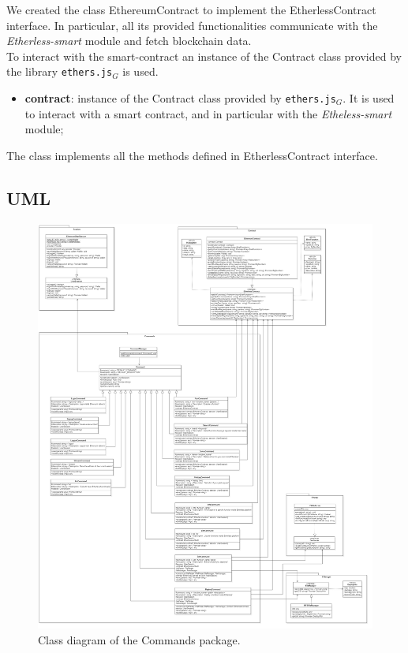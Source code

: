 			We created the class EthereumContract to implement the EtherlessContract interface. In particular, all its provided functionalities communicate with the \textit{Etherless-smart} module and fetch blockchain data. \\ To interact with the smart-contract an instance of the Contract class provided by the library \texttt{ethers.js}$_{G}$ is used.
					\begin{itemize}
						\item \textbf{contract}: instance of the Contract class provided by \texttt{ethers.js}$_{G}$. It is used to interact with a smart contract, and in particular with the \textit{Etheless-smart} module; 
					\end{itemize}
				
					The class implements all the methods defined in EtherlessContract interface.
	
	\subsection{UML}
	\begin{figure} [H]
		\centering
		\includegraphics[width=0.85\linewidth]{diagrammi/etherless-cli/Classi}
		\caption{Class diagram of the Commands package.}
	\end{figure}

